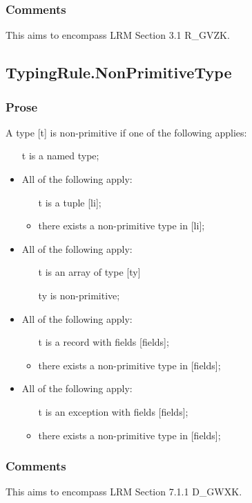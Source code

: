 \documentclass{book}
\begin{document}
    \subsubsection{Comments}
    This aims to encompass LRM Section 3.1 R\_GVZK.

\subsection{TypingRule.NonPrimitiveType}

    \subsubsection{Prose} 
    A type [t] is non-primitive if one of the following applies:
    \begin{itemize}
    \item  [t] is a named type;
    \item  All of the following apply:
      \begin{itemize}
      \item  [t] is a tuple [li];
      \item  there exists a non-primitive type in [li];
      \end{itemize}
    \item  All of the following apply:
      \begin{itemize}
      \item  [t] is an array of type [ty]
      \item  [ty] is non-primitive; 
      \end{itemize}
    \item  All of the following apply:
      \begin{itemize}
      \item  [t] is a record with fields [fields];
      \item  there exists a non-primitive type in [fields];
      \end{itemize}
    \item  All of the following apply:
      \begin{itemize}
      \item  [t] is an exception with fields [fields];
      \item  there exists a non-primitive type in [fields];
      \end{itemize}
    \end{itemize}

    \subsubsection{Comments}
    This aims to encompass LRM Section 7.1.1 D\_GWXK.
\end{document}
